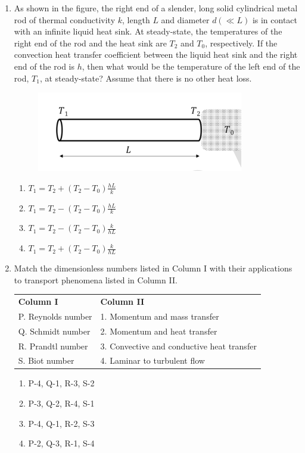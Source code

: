 \documentclass[journal]{IEEEtran}
\theoremstyle{remark}
\begin{document}
\begin{enumerate}[resume]
\item As shown in the figure, the right end of a slender, long solid cylindrical metal rod of thermal conductivity $k$, length $L$ and diameter $d (\ll L)$ is in contact with an infinite liquid heat sink. At steady-state, the temperatures of the right end of the rod and the heat sink are $T_2$ and $T_0$, respectively. If the convection heat transfer coefficient between the liquid heat sink and the right end of the rod is $h$, then what would be the temperature of the left end of the rod, $T_1$, at steady-state? Assume that there is no other heat loss. \hfill{}
\begin{figure}[H]
    \centering
    \includegraphics[width=0.4\columnwidth]{figs/Q.38.png}
    \caption{}
    \label{fig:placeholder}
\end{figure}
\begin{multicols}{2}
\begin{enumerate}
\item $T_1 = T_2 + (T_2 - T_0)\frac{hL}{k}$
\item $T_1 = T_2 - (T_2 - T_0)\frac{hL}{k}$
\item $T_1 = T_2 - (T_2 - T_0)\frac{k}{hL}$
\item $T_1 = T_2 + (T_2 - T_0)\frac{k}{hL}$
\end{enumerate}
\end{multicols}

\item Match the dimensionless numbers listed in Column I with their applications to transport phenomena listed in Column II. \hfill{}
\begin{center}
\begin{tabular}{ll}
\textbf{Column I} & \textbf{Column II} \\
P. Reynolds number & 1. Momentum and mass transfer \\
Q. Schmidt number & 2. Momentum and heat transfer \\
R. Prandtl number & 3. Convective and conductive heat transfer \\
S. Biot number & 4. Laminar to turbulent flow \\
\end{tabular}
\end{center}
\begin{multicols}{2}
    \begin{enumerate}
\item P-4, Q-1, R-3, S-2
\item P-3, Q-2, R-4, S-1
\item P-4, Q-1, R-2, S-3
\item P-2, Q-3, R-1, S-4
\end{enumerate}
\end{multicols}


\end{enumerate}
\end{document}
